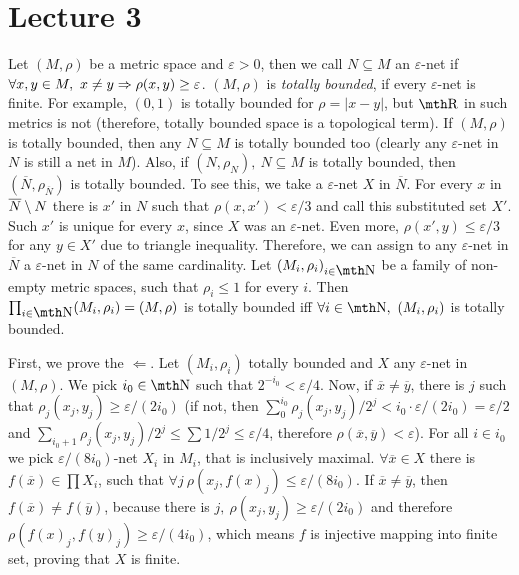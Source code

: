 \chapter{Lecture 3}

 Let $(M,\rho)$ be a metric space and 
$\varepsilon>0$, then we call $N\subseteq M$ an $\varepsilon$-net 
if $\forall x,y \in M,\ x\neq y \Rightarrow \rho(x,y) \geq \varepsilon$. 
$(M,\rho)$ is {\it totally bounded}, if every $\varepsilon$-net 
is finite. For example, $(0,1)$ is totally bounded for $\rho=|x-y|$,
but $\R$ in such metrics is not (therefore, totally bounded space 
is a topological term).
\smallskip
If $(M,\rho)$ is totally bounded, then any $N\subseteq M$ is totally 
bounded too (clearly any $\varepsilon$-net in $N$ is still a net in 
$M$). Also, if $(N,\rho_{N}),\ N\subseteq M$ is totally bounded,
then $(\overline N,\rho_{\overline N})$ is totally bounded. To see 
this, we take a $\varepsilon$-net $X$ in $\overline N$. For every 
$x$ in $\overline N \setminus N$ there is $x'$ in $N$ such that $\rho(x,x')
< \varepsilon/3$ and call this substituted set $X'$. Such $x'$ is 
unique for every $x$, since $X$ was an $\varepsilon$-net. Even 
more, $\rho(x',y)\leq \varepsilon/3$ for any $y\in X'$ due to triangle 
inequality. Therefore, we can assign to any $\varepsilon$-net in 
$\overline N$ a $\varepsilon$-net in $N$ of the same cardinality.
\smallskip
Let $(M_i,\rho_i)_{i\in \N}$ be a family of non-empty metric spaces,
such that $\rho_i \leq 1$ for every $i$. Then $\prod_{i\in \N} 
(M_i,\rho_i) = (M,\rho)$ is totally bounded iff $\forall i\in \N,\ 
(M_i,\rho_i)$ is totally bounded.

First, we prove the $\Leftarrow$. Let $(M_i,\rho_i)$ totally bounded 
and $X$ any $\varepsilon$-net in $(M,\rho)$. We pick $i_0\in \N$ 
such that $2^{-i_0} < \varepsilon/4$. Now, if $\overline x \neq 
\overline y$, there is $j$ such that $\rho_j(x_j,y_j) \geq 
\varepsilon / (2i_0)$ (if not, then $\sum_0^{i_0} \rho_j(x_j,y_j)/
2^{j} < i_0 \cdot \varepsilon/(2i_0) = \varepsilon/2$ and 
$\sum_{i_0 +1} \rho_j(x_j,y_j) / 2^j \leq \sum 1/2^j \leq 
\varepsilon/4$, therefore $\rho(\overline x, \overline y) < 
\varepsilon$). For all $i\in i_0$ we pick $\varepsilon/(8i_0)$-net
$X_i$ in $M_i$, that is inclusively maximal. $\forall \overline x 
\in X$ there is $f(\overline x)\in \prod X_i$, such that $\forall j\ 
\rho(x_j, f(x)_j) \leq \varepsilon/(8i_0)$. 
If $\overline x\neq \overline y$, then $f(\overline x) \neq f(\overline 
y)$, because 
there is $j,\ \rho(x_j,y_j)\geq \varepsilon /(2i_0)$ and therefore 
$\rho(f(x)_j,f(y)_j) \geq \varepsilon /(4i_0)$, which means
$f$ is injective mapping into finite set, proving that $X$ is 
finite.


